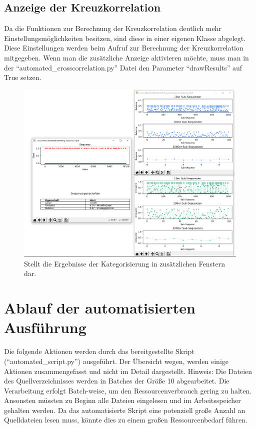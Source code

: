 	
\subsection{Anzeige der Kreuzkorrelation} Da die Funktionen zur Berechnung der Kreuzkorrelation deutlich mehr Einstellungsmöglichkeiten besitzen, sind diese in einer eigenen Klasse abgelegt.
Diese Einstellungen werden beim Aufruf zur Berechnung der Kreuzkorrelation mitgegeben.
Wenn man die zusätzliche Anzeige aktivieren möchte, muss man in der \enquote{automated\_crosscorrelation.py} Datei den Parameter \enquote{drawResults} auf True setzen.

\begin{figure}[H]
	\includegraphics[width=\linewidth]{pythonImplementation/images/matplot_view.PNG}
	\caption[Zusätzliche Anzeige der Ergebnisse]{Stellt die Ergebnisse der Kategorisierung in zusätzlichen Fenstern dar\footnotemark. }
	\label{fig:matplotlib:view}
\end{figure}

\pagebreak
\section{Ablauf der automatisierten Ausführung}
Die folgende Aktionen werden durch das bereitgestellte Skript (\enquote{automated\_script.py}) ausgeführt. 
Der Übersicht wegen, werden einige Aktionen zusammengefasst und nicht im Detail dargestellt.
Hinweis: Die Dateien des Quellverzeichnisses werden in Batches der Größe 10 abgearbeitet.
Die Verarbeitung erfolgt Batch-weise, um den Ressourcenverbrauch gering zu halten.
Ansonsten müssten zu Beginn alle Dateien eingelesen und im Arbeitsspeicher gehalten werden.
Da das automatisierte Skript eine potenziell große Anzahl an Quelldateien lesen muss, könnte dies zu einem großen Ressourcenbedarf führen.

